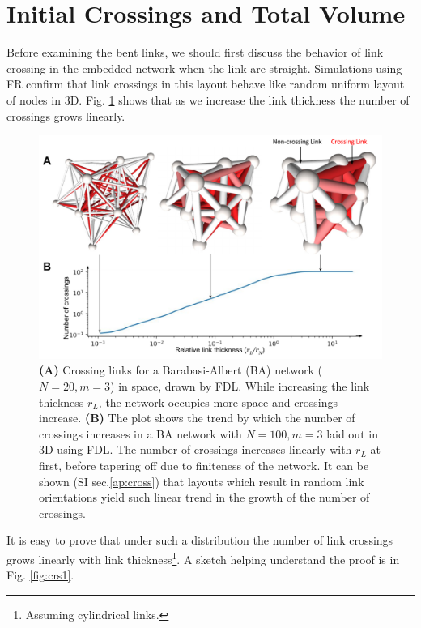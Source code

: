 \documentclass[nofootinbib,preprint,floatfix,titlepage,endfloats,superscriptaddress]{revtex4} %
\begin{document}
\section{Initial Crossings and Total Volume\label{ap:cross}}
Before examining the bent links, we should first discuss the behavior of link crossing in the embedded network when the link are straight. Simulations using FR confirm that link crossings in this layout behave like random uniform layout of nodes in 3D. 
Fig. \ref{fig:crs} shows that as we increase the link thickness the number of crossings grows linearly.
\begin{figure}
    \centering
    \includegraphics[width=.7\columnwidth]{fig-09-19/3D-cross.pdf}
    \caption{\scriptsize
    {\bf (A)}  Crossing links for a Barabasi-Albert (BA) network ($N = 20, m = 3$) in space, drawn by FDL. While increasing the link thickness $r_L$, the network occupies more space and crossings increase. 
    {\bf (B)} The plot shows the trend by which the number of crossings increases in a BA network with $N=100, m =3$ laid out in 3D using FDL.
    The number of crossings increases linearly with $r_L$ at first, before tapering off due to finiteness of the network. It can be shown (SI sec.\ref{ap:cross}) that layouts which result in random link orientations yield such linear trend in the growth of the number of crossings.
    }     
    \label{fig:crs}
\end{figure}
It is easy to prove that under such a distribution the number of link crossings grows linearly with link thickness\footnote{Assuming cylindrical links. %
}. A sketch helping understand the proof is in Fig. \ref{fig:crs1}. 
\end{document}
